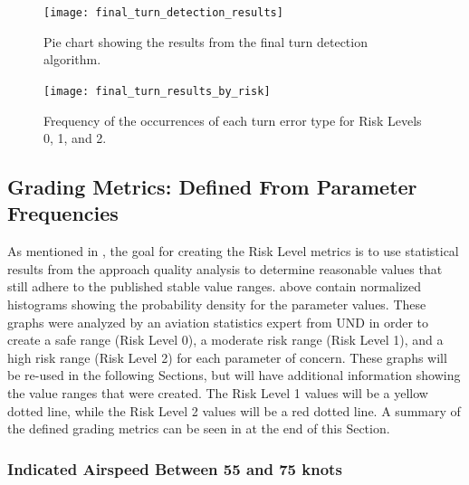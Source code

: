             \begin{figure}
            	\centering
                \texttt{[image: final\_turn\_detection\_results]}
                \caption{Pie chart showing the results from the final turn detection algorithm.}
                \label{fig:final_turn_results_ratios}
            \end{figure}
            
            \begin{figure}
            	\centering
                \texttt{[image: final\_turn\_results\_by\_risk]}
                \caption{Frequency of the occurrences of each turn error type for Risk Levels 0, 1, and 2.}
                \label{fig:final_turn_results_by_risk}
            \end{figure}


\subsection{Grading Metrics:  Defined From Parameter Frequencies}

	As mentioned in , the goal for creating the Risk Level metrics is to use statistical results from the approach quality analysis to determine reasonable values that still adhere to the published stable value ranges.   above contain normalized histograms showing the probability density for the parameter values.  These graphs were analyzed by an aviation statistics expert from UND in order to create a safe range (Risk Level 0), a moderate risk range (Risk Level 1), and a high risk range (Risk Level 2) for each parameter of concern.  These graphs will be re-used in the following Sections, but will have additional information showing the value ranges that were created.  The Risk Level 1 values will be a yellow dotted line, while the Risk Level 2 values will be a red dotted line.  A summary of the defined grading metrics can be seen in  at the end of this Section.
    
    	
    \subsubsection{Indicated Airspeed Between 55 and 75 knots}
    
